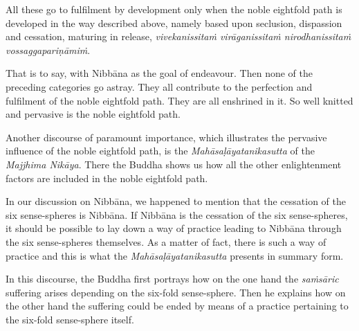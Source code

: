 All these go to fulfilment by development only when the noble eightfold path is developed in the way described above, namely based upon seclusion, dispassion and cessation, maturing in release, \emph{vivekanissitaṁ virāganissitaṁ nirodhanissitaṁ vossaggapariṇāmiṁ}.

That is to say, with Nibbāna as the goal of endeavour. Then none of the preceding categories go astray. They all contribute to the perfection and fulfilment of the noble eightfold path. They are all enshrined in it. So well knitted and pervasive is the noble eightfold path.

Another discourse of paramount importance, which illustrates the pervasive influence of the noble eightfold path, is the \emph{Mahāsaḷāyatanikasutta} of the \emph{Majjhima Nikāya}. There the Buddha shows us how all the other enlightenment factors are included in the noble eightfold path.

In our discussion on Nibbāna, we happened to mention that the cessation of the six sense-spheres is Nibbāna. If Nibbāna is the cessation of the six sense-spheres, it should be possible to lay down a way of practice leading to Nibbāna through the six sense-spheres themselves. As a matter of fact, there is such a way of practice and this is what the \emph{Mahāsaḷāyatanikasutta} presents in summary form.

In this discourse, the Buddha first portrays how on the one hand the \emph{saṁsāric} suffering arises depending on the six-fold sense-sphere. Then he explains how on the other hand the suffering could be ended by means of a practice pertaining to the six-fold sense-sphere itself.

